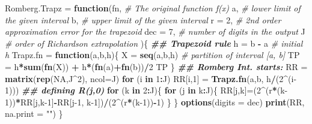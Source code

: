 \documentclass[
]{book}
\newenvironment{Shaded}{\begin{snugshade}}{\end{snugshade}}
\newcommand{\AttributeTok}[1]{\textcolor[rgb]{0.13,0.29,0.53}{#1}}
\newcommand{\CommentTok}[1]{\textcolor[rgb]{0.56,0.35,0.01}{\textit{#1}}}
\newcommand{\ConstantTok}[1]{\textcolor[rgb]{0.56,0.35,0.01}{#1}}
\newcommand{\ControlFlowTok}[1]{\textcolor[rgb]{0.13,0.29,0.53}{\textbf{#1}}}
\newcommand{\DecValTok}[1]{\textcolor[rgb]{0.00,0.00,0.81}{#1}}
\newcommand{\DocumentationTok}[1]{\textcolor[rgb]{0.56,0.35,0.01}{\textbf{\textit{#1}}}}
\newcommand{\FunctionTok}[1]{\textcolor[rgb]{0.13,0.29,0.53}{\textbf{#1}}}
\newcommand{\NormalTok}[1]{#1}
\newcommand{\OtherTok}[1]{\textcolor[rgb]{0.56,0.35,0.01}{#1}}
\newcommand{\SpecialCharTok}[1]{\textcolor[rgb]{0.81,0.36,0.00}{\textbf{#1}}}
\newcommand{\StringTok}[1]{\textcolor[rgb]{0.31,0.60,0.02}{#1}}
\begin{document}
\begin{Shaded}
\begin{Highlighting}[]
\NormalTok{Romberg.Trapz }\OtherTok{=} \ControlFlowTok{function}\NormalTok{(fn,      }\CommentTok{\# The original function f(x)}
\NormalTok{                         a,       }\CommentTok{\# lower limit of the given interval}
\NormalTok{                         b,       }\CommentTok{\# upper limit of the given interval}
                         \AttributeTok{r =} \DecValTok{2}\NormalTok{,   }\CommentTok{\# 2nd order approximation error for the trapezoid }
                         \AttributeTok{dec =} \DecValTok{7}\NormalTok{, }\CommentTok{\# number of digits in the output}
\NormalTok{                         J        }\CommentTok{\# order of Richardson extrapolation}
\NormalTok{                         )\{}
   \DocumentationTok{\#\# Trapezoid rule}
\NormalTok{   h }\OtherTok{=}\NormalTok{ b }\SpecialCharTok{{-}}\NormalTok{ a       }\CommentTok{\# initial h}
\NormalTok{   Trapz.fn }\OtherTok{=} \ControlFlowTok{function}\NormalTok{(a,b,h)\{}
\NormalTok{                   X }\OtherTok{=} \FunctionTok{seq}\NormalTok{(a,b,h)  }\CommentTok{\# partition of interval [a, b]}
\NormalTok{                   TP }\OtherTok{=}\NormalTok{ h}\SpecialCharTok{*}\FunctionTok{sum}\NormalTok{(}\FunctionTok{fn}\NormalTok{(X)) }\SpecialCharTok{+}\NormalTok{ h}\SpecialCharTok{*}\NormalTok{(}\FunctionTok{fn}\NormalTok{(a)}\SpecialCharTok{+}\FunctionTok{fn}\NormalTok{(b))}\SpecialCharTok{/}\DecValTok{2}  
\NormalTok{                   TP}
\NormalTok{                  \}}
   \DocumentationTok{\#\# Romberg Int. starts:}
\NormalTok{   RR }\OtherTok{=} \FunctionTok{matrix}\NormalTok{(}\FunctionTok{rep}\NormalTok{(}\ConstantTok{NA}\NormalTok{,J}\SpecialCharTok{\^{}}\DecValTok{2}\NormalTok{), }\AttributeTok{ncol=}\NormalTok{J)}
   \ControlFlowTok{for}\NormalTok{ (i }\ControlFlowTok{in} \DecValTok{1}\SpecialCharTok{:}\NormalTok{J)  RR[i,}\DecValTok{1}\NormalTok{] }\OtherTok{=} \FunctionTok{Trapz.fn}\NormalTok{(a,b, h}\SpecialCharTok{/}\NormalTok{(}\DecValTok{2}\SpecialCharTok{\^{}}\NormalTok{(i}\DecValTok{{-}1}\NormalTok{)))   }\DocumentationTok{\#\# defining R(j,0)}
   \ControlFlowTok{for}\NormalTok{ (k }\ControlFlowTok{in} \DecValTok{2}\SpecialCharTok{:}\NormalTok{J)\{}
       \ControlFlowTok{for}\NormalTok{ (j }\ControlFlowTok{in}\NormalTok{ k}\SpecialCharTok{:}\NormalTok{J)\{}
\NormalTok{           RR[j,k]}\OtherTok{=}\NormalTok{(}\DecValTok{2}\SpecialCharTok{\^{}}\NormalTok{(r}\SpecialCharTok{*}\NormalTok{(k}\DecValTok{{-}1}\NormalTok{))}\SpecialCharTok{*}\NormalTok{RR[j,k}\DecValTok{{-}1}\NormalTok{]}\SpecialCharTok{{-}}\NormalTok{RR[j}\DecValTok{{-}1}\NormalTok{, k}\DecValTok{{-}1}\NormalTok{])}\SpecialCharTok{/}\NormalTok{(}\DecValTok{2}\SpecialCharTok{\^{}}\NormalTok{(r}\SpecialCharTok{*}\NormalTok{(k}\DecValTok{{-}1}\NormalTok{))}\SpecialCharTok{{-}}\DecValTok{1}\NormalTok{)}
\NormalTok{        \}}
\NormalTok{     \}}
   \FunctionTok{options}\NormalTok{(}\AttributeTok{digits =}\NormalTok{ dec)}
   \FunctionTok{print}\NormalTok{(RR, }\AttributeTok{na.print =} \StringTok{""}\NormalTok{)}
\NormalTok{ \}}
\end{Highlighting}
\end{Shaded}
\end{document}
